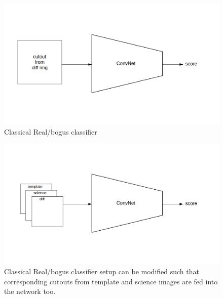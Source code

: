 \begin{figure}
  \centering
  \includegraphics[width=1\textwidth]{material/rb-classifier}
  \caption{Classical Real/bogus classifier}
  \label{fig:rbdiagram}
\end{figure}

\begin{figure}
  \centering
  \includegraphics[width=1\textwidth]{material/rb-classifier-mod}
  \caption{Classical Real/bogus classifier setup can be modified such that corresponding cutouts from template and science images are fed into the network too.}
  \label{fig:rbdiagram}
\end{figure}




